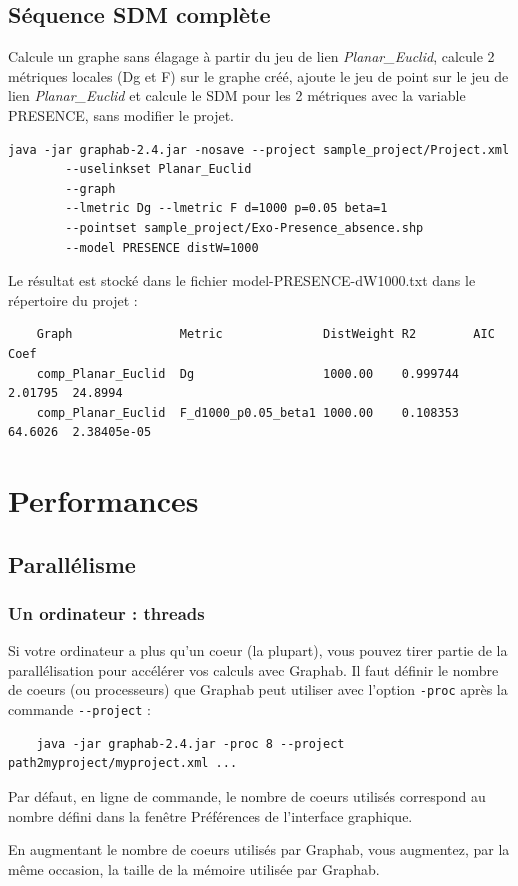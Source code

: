 \documentclass[a4paper,10pt]{report}
\begin{document}
\section{Séquence SDM complète}
Calcule un graphe sans élagage à partir du jeu de lien \textit{Planar\_Euclid}, calcule 2 métriques locales (Dg et F) sur le graphe créé, ajoute le jeu de point 
sur le jeu de lien \textit{Planar\_Euclid} et calcule le SDM pour les 2 métriques avec la variable PRESENCE, sans modifier le projet.
\begin{Verbatim}[tabsize=4]
	java -jar graphab-2.4.jar -nosave --project sample_project/Project.xml 
		--uselinkset Planar_Euclid 
		--graph 
		--lmetric Dg --lmetric F d=1000 p=0.05 beta=1 
		--pointset sample_project/Exo-Presence_absence.shp 
		--model PRESENCE distW=1000
\end{Verbatim}
Le résultat est stocké dans le fichier model-PRESENCE-dW1000.txt dans le répertoire du projet :
\begin{Verbatim}
	Graph               Metric              DistWeight R2        AIC      Coef
	comp_Planar_Euclid  Dg                  1000.00    0.999744  2.01795  24.8994
	comp_Planar_Euclid  F_d1000_p0.05_beta1 1000.00    0.108353  64.6026  2.38405e-05
\end{Verbatim}

\chapter{Performances}
\label{perf}
\section{Parallélisme}
\subsection{Un ordinateur : threads}
Si votre ordinateur a plus qu'un coeur (la plupart), vous pouvez tirer partie de la parallélisation pour accélérer vos calculs avec Graphab.
Il faut définir le nombre de coeurs (ou processeurs) que Graphab peut utiliser avec l'option \verb|-proc| après la commande \verb|--project| :
\begin{Verbatim}
	java -jar graphab-2.4.jar -proc 8 --project path2myproject/myproject.xml ...
\end{Verbatim}
Par défaut, en ligne de commande, le nombre de coeurs utilisés correspond au nombre défini dans la fenêtre Préférences de l'interface graphique.

En augmentant le nombre de coeurs utilisés par Graphab, vous augmentez, par la même occasion, la taille de la mémoire utilisée par Graphab.
\end{document}
